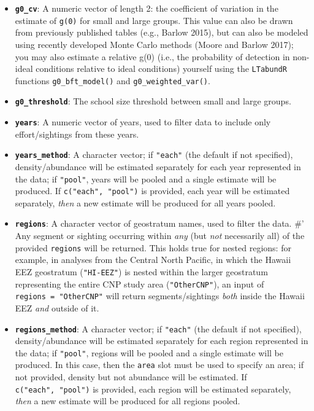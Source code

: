 \documentclass[
]{book}
\begin{document}
\begin{itemize}
\item
  \textbf{\texttt{g0\_cv}}: A numeric vector of length 2: the coefficient of variation in the estimate of \texttt{g(0)} for small and large groups. This value can also be drawn from previously published tables (e.g., Barlow 2015), but can also be modeled using recently developed Monte Carlo methods (Moore and Barlow 2017); you may also estimate a relative g(0) (i.e., the probability of detection in non-ideal conditions relative to ideal conditions) yourself using the \texttt{LTabundR} functions \texttt{g0\_bft\_model()} and \texttt{g0\_weighted\_var()}.
\item
  \textbf{\texttt{g0\_threshold}}: The school size threshold between small and large groups.
\item
  \textbf{\texttt{years}}: A numeric vector of years, used to filter data to include only effort/sightings from these years.
\item
  \textbf{\texttt{years\_method}}: A character vector; if \texttt{"each"} (the default if not specified), density/abundance will be estimated separately for each year represented in the data; if \texttt{"pool"}, years will be pooled and a single estimate will be produced. If \texttt{c("each",\ "pool")} is provided, each year will be estimated separately, \emph{then} a new estimate will be produced for all years pooled.
\item
  \textbf{\texttt{regions}}: A character vector of geostratum names, used to filter the data.
  \#' Any segment or sighting occurring within \emph{any} (but \emph{not} necessarily all) of the provided \texttt{regions} will be returned. This holds true for nested regions: for example, in analyses from the Central North Pacific, in which the Hawaii EEZ geostratum (\texttt{"HI-EEZ"}) is nested within the larger geostratum representing the entire CNP study area (\texttt{"OtherCNP"}), an input of \texttt{regions\ =\ "OtherCNP"} will return segments/sightings \emph{both} inside the Hawaii EEZ \emph{and} outside of it.
\item
  \textbf{\texttt{regions\_method}}: A character vector; if \texttt{"each"} (the default if not specified), density/abundance will be estimated separately for each region represented in the data; if \texttt{"pool"}, regions will be pooled and a single estimate will be produced. In this case, then the \texttt{area} slot must be used to specify an area; if not provided, density but not abundance will be estimated. If \texttt{c("each",\ "pool")} is provided, each region will be estimated separately, \emph{then} a new estimate will be produced for all regions pooled.

\end{itemize}
\end{document}

